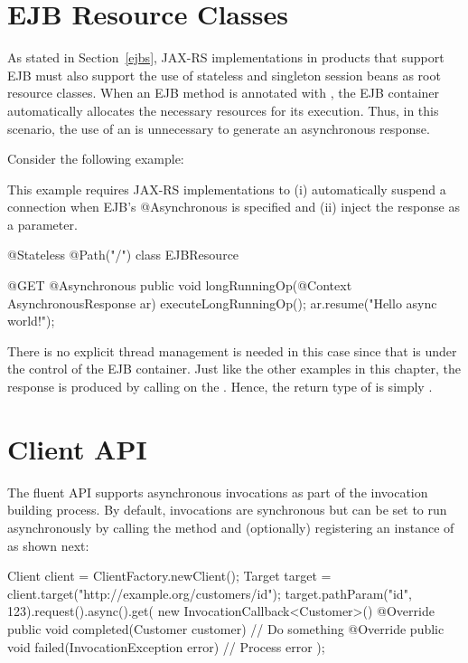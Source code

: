 \section{EJB Resource Classes}
\label{async_ejbs}

As stated in Section~\ref{ejbs}, JAX-RS implementations in products that
support EJB must also support the use of stateless and singleton session beans
as root resource classes. When an EJB method is annotated with , the 
EJB container automatically allocates the necessary resources for its execution. 
Thus, in this scenario, the use of an  is unnecessary to generate
an asynchronous response.

Consider the following example:

\begin{ednote}
This example requires JAX-RS implementations to (i) automatically suspend
a connection when EJB's @Asynchronous is specified and (ii) inject the response as a parameter.
\end{ednote}

\begin{listing}{1}
@Stateless 
@Path("/")
class EJBResource {

    @GET @Asynchronous
    public void longRunningOp(@Context AsynchronousResponse ar) {
        executeLongRunningOp();
        ar.resume("Hello async world!");
    }
}
\end{listing}

There is no explicit thread management is needed in this case since that is
under the control of the EJB container. Just like the other examples in this chapter,
the response is produced by calling  on the . Hence,
the return type of  is simply .

\section{Client API}
\label{client_api_async}

The fluent API supports asynchronous invocations as part of the invocation building process. By default, invocations are synchronous but can be set to run asynchronously by calling the  method and (optionally) registering an instance of  as shown next:

\begin{listing}{1}
Client client = ClientFactory.newClient();
Target target = client.target("http://example.org/customers/{id}");
target.pathParam("id", 123).request().async().get(
    new InvocationCallback<Customer>() {
        @Override
        public void completed(Customer customer) {
            // Do something
        }
        @Override
        public void failed(InvocationException error) {
            // Process error
        }
    });
\end{listing}


